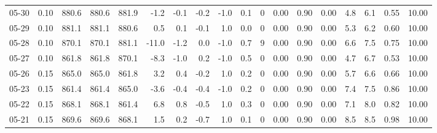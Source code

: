 \begin{threeparttable}
{\begin{tabular}{lrrrrrrrrrrrrrrrrr}
  05-30 &     0.10 & 880.6 & 880.6 & 881.9 &       -1.2 &           -0.1 &                      -0.2 &                     -1.0 &                 0.1 &              0 &       0.00 &      0.90 &           0.00 &              4.8 &                 6.1 &            0.55 &                  10.00 \\
  05-29 &     0.10 & 881.1 & 881.1 & 880.6 &        0.5 &            0.1 &                      -0.1 &                      1.0 &                 0.0 &              0 &       0.00 &      0.90 &           0.00 &              5.3 &                 6.2 &            0.60 &                  10.00 \\
  05-28 &     0.10 & 870.1 & 870.1 & 881.1 &      -11.0 &           -1.2 &                       0.0 &                     -1.0 &                 0.7 &              9 &       0.00 &      0.90 &           0.00 &              6.6 &                 7.5 &            0.75 &                  10.00 \\
  05-27 &     0.10 & 861.8 & 861.8 & 870.1 &       -8.3 &           -1.0 &                       0.2 &                     -1.0 &                 0.5 &              0 &       0.00 &      0.90 &           0.00 &              4.7 &                 6.7 &            0.53 &                  10.00 \\
  05-26 &     0.15 & 865.0 & 865.0 & 861.8 &        3.2 &            0.4 &                      -0.2 &                      1.0 &                 0.2 &              0 &       0.00 &      0.90 &           0.00 &              5.7 &                 6.6 &            0.66 &                  10.00 \\
  05-23 &     0.15 & 861.4 & 861.4 & 865.0 &       -3.6 &           -0.4 &                      -0.4 &                     -1.0 &                 0.2 &              0 &       0.00 &      0.90 &           0.00 &              7.4 &                 7.5 &            0.86 &                  10.00 \\
  05-22 &     0.15 & 868.1 & 868.1 & 861.4 &        6.8 &            0.8 &                      -0.5 &                      1.0 &                 0.3 &              0 &       0.00 &      0.90 &           0.00 &              7.1 &                 8.0 &            0.82 &                  10.00 \\
  05-21 &     0.15 & 869.6 & 869.6 & 868.1 &        1.5 &            0.2 &                      -0.7 &                      1.0 &                 0.1 &              0 &       0.00 &      0.90 &           0.00 &              8.5 &                 8.5 &            0.98 &                  10.00 \\

\end{tabular}}
\end{threeparttable}
